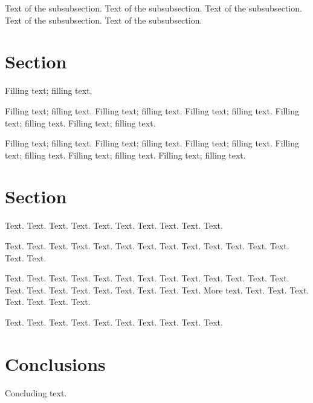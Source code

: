\documentclass[11pt]{article}
\begin{document}
Text of the subsubsection.
Text of the subsubsection.
Text of the subsubsection.
Text of the subsubsection.
Text of the subsubsection.


\section{Section}

Filling text; filling text.

Filling text; filling text.
Filling text; filling text.
Filling text; filling text.
Filling text; filling text.
Filling text; filling text.

Filling text; filling text.
Filling text; filling text.
Filling text; filling text.
Filling text; filling text.
Filling text; filling text.
Filling text; filling text.

\section{Section}

Text. Text. Text. Text. Text.
Text. Text. Text. Text. Text.

Text. Text. Text. Text. Text.
Text. Text. Text. Text. Text.
Text. Text. Text. Text. Text.

Text. Text. Text. Text. Text.
Text. Text. Text. Text. Text.
Text. Text. Text. Text. Text.
Text. Text. Text. Text. Text.
Text. Text. More text. Text. Text.
Text. Text. Text. Text. Text.

Text. Text. Text. Text. Text.
Text. Text. Text. Text. Text.

\section{Conclusions}

Concluding text.



\end{document}
